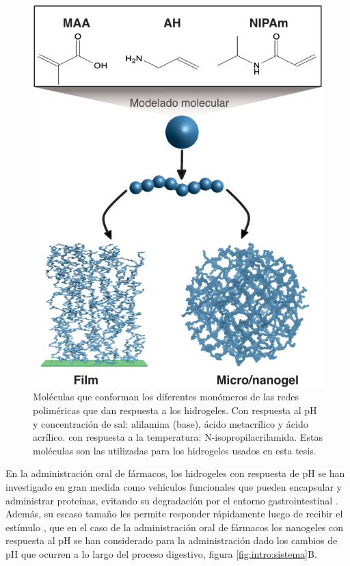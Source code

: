 \begin{figure}[!tb]
	\centering
	\includegraphics[width=0.8\linewidth]{Figures/modelos/hidrogeles.pdf}
	\caption{Mol\'eculas  que conforman los diferentes mon\'omeros de las redes polim\'ericas que dan respuesta a los hidrogeles. Con respuesta al pH y concentraci\'on de sal: alilamina (base),  \'acido metacr\'ilico y \'acido acr\'ilico. con respuesta a la temperatura: N-isopropilacrilamida.
		Estas mol\'eculas son las utilizadas para los hidrogeles usados en esta tesis.}
	\label{fig:intro:acidos-aa-maa}
\end{figure}


En la administraci\'on oral de f\'armacos, los hidrogeles con respuesta de pH se han investigado en gran medida como veh\'iculos funcionales que pueden encapsular y administrar prote\'inas, evitando su degradaci\'on por el entorno gastrointestinal \cite{malmsten2010biomacromolecules,renukuntla2013approaches,koetting2014ph}.
Adem\'as, su escaso tama\~no les permite responder r\'apidamente luego de recibir el est\'imulo \cite{tanaka1979kinetics}, que en el caso de la administraci\'on oral de f\'armacos los nanogeles con respuesta al pH se han considerado para la administraci\'on dado los cambios de pH que ocurren a lo largo del proceso digestivo, figura \ref{fig:intro:sistema}B.

